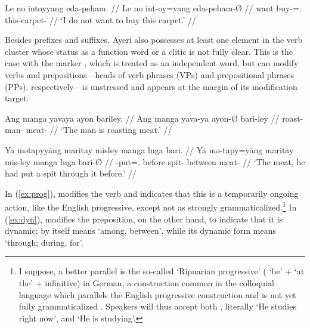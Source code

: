\ex\begingl
	\gla Le no intoyyang eda-peham. //
	\glb Le no int-oy=yang eda-peham-Ø //
	\glc \PatTI{} want buy-\Neg{}=\Fsg{}.\Aarg{} this-carpet-\Top{} //
	\glft `I do not want to buy this carpet.' //
\endgl\xe

Besides prefixes and suffixes, Ayeri also possesses at least one element in the
verb cluster whose status as a function word or a clitic is not fully clear.
This is the case with the marker , which is treated as an
independent word, but can modify verbs and prepositions---heads of verb phrases
(VPs) and prepositional phrases (PPs), respectively---is unstressed and appears
at the margin of its modification target:

\pex
\a\label{ex:prog}\begingl
	\gla Ang manga yavaya ayon bariley. //
	\glb Ang manga yava-ya ayon-Ø bari-ley //
	\glc \AgtT{} \Prog{} roast-\TsgM{} man-\Top{} meat-\PargI{} //
	\glft `The man is roasting meat.' //
\endgl

\a\label{ex:dyn}\begingl
	\gla Ya mətapyyāng maritay misley manga luga bari. //
	\glb Ya mə-tapy=yāng maritay mis-ley manga luga bari-Ø //
	\glc \LocT{} \Pst{}-put=\TsgM{}.\Aarg{} before spit-\PargI{} \Dyn{} 
		between meat-\Top{} //
	\glft `The meat, he had put a spit through it before.' //
\endgl

\xe

In (\ref{ex:prog}),  modifies the verb 
and indicates that this is a temporarily ongoing action, like the English
progressive, except not as strongly grammaticalized.\footnote{I suppose, a
better parallel is the so-called  `Ripuarian
progressive' ( `be' +  `at the' + infinitive) in German, a
construction common in the colloquial language which parallels the English
progressive construction and is not yet fully grammaticalized
\citep[435]{dudengram2016}. Speakers will thus accept both , literally `He studies right now', and  `He is
studying'.
% 
}
%
In (\ref{ex:dyn}),  modifies the preposition, on the other 
hand, to indicate that it is dynamic:  by itself means `among, 
between', while its dynamic form  means `through; 
during, for'.

